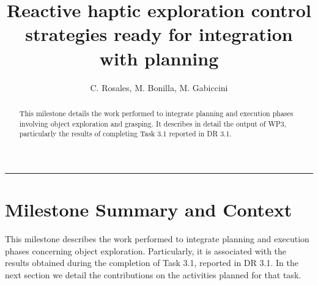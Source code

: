 \documentclass[a4paper,11pt,pdf]{pacmanreport}
\title{Reactive haptic exploration control strategies ready for integration with planning}
\author{C. Rosales, M. Bonilla, M. Gabiccini}
\begin{document}
\maketitle

\begin{abstract}
\noindent This milestone details the work performed to integrate planning and execution phases involving object exploration and grasping. It describes in detail the output of WP3, particularly the results of completing Task 3.1 reported in DR 3.1.
\end{abstract}


\vspace{.2em}
\hrule

\vspace{.2em}
\footnotesize

\tableofcontents

\normalsize

\newpage

\section{Milestone Summary and Context}

This milestone describes the work performed to integrate planning and execution phases concerning object exploration. Particularly, it is associated with the results obtained during the completion of Task 3.1, reported in DR 3.1. In the next section we detail the contributions on the activities planned for that task.





\end{document}
